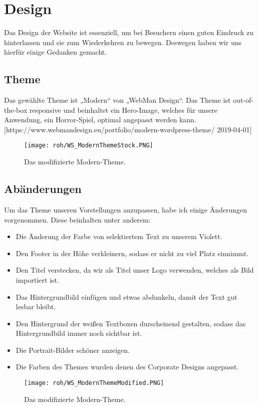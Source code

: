 \section{Design}
Das Design der Website ist essenziell, um bei Besuchern einen guten Eindruck zu hinterlassen und sie zum Wiederkehren zu bewegen. Deswegen haben wir uns hierfür einige Gedanken gemacht.
\subsection{Theme}
Das gewählte Theme ist „Modern“ von „WebMan Design“. Das Theme ist out-of-the-box responsive und beinhaltet ein Hero-Image, welches für unsere Anwendung, ein Horror-Spiel, optimal angepasst werden kann.
[https://www.webmandesign.eu/portfolio/modern-wordpress-theme/ 2019-04-01]
\begin{figure}[H]
    \centering
    \texttt{[image: roh/WS\_ModernThemeStock.PNG]}
    \caption{Das modifizierte Modern-Theme.}
    \label{WS:ModerThemeStock}
\end{figure}

\subsection{Abänderungen}
Um das Theme unseren Vorstellungen anzupassen, habe ich einige Änderungen vorgenommen. Diese beinhalten unter anderem:
\begin{itemize}
    \item Die Änderung der Farbe von selektiertem Text zu unserem Violett.
    \item Den Footer in der Höhe verkleinern, sodass er nicht zu viel Platz einnimmt.
    \item Den Titel verstecken, da wir als Titel unser Logo verwenden, welches als Bild importiert ist.
    \item Das Hintergrundbild einfügen und etwas abdunkeln, damit der Text gut lesbar bleibt.
    \item Den Hintergrund der weißen Textboxen durscheinend gestalten, sodass das Hintergrundbild immer noch sichtbar ist.
    \item Die Portrait-Bilder schöner anzeigen.
    \item Die Farben des Themes wurden denen des Corporate Designs angepasst.
\end{itemize}
\begin{figure}[H]
    \centering
    \texttt{[image: roh/WS\_ModernThemeModified.PNG]}
    \caption{Das modifizierte Modern-Theme.}
    \label{WS:ModerThemeModified}
\end{figure}